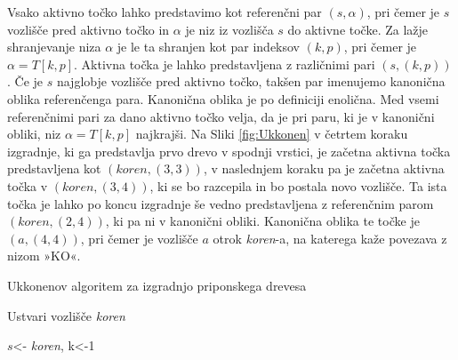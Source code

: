 Vsako aktivno točko lahko predstavimo kot referenčni par $(s,\alpha)$, pri čemer je $s$ vozlišče pred aktivno točko in $\alpha$ je niz iz vozlišča $s$ do aktivne točke. Za lažje shranjevanje niza $\alpha$ je le ta shranjen kot par indeksov $(k,p)$, pri čemer je $\alpha=T[k,p]$. Aktivna točka je lahko predstavljena z različnimi pari $(s, (k,p))$. Če je $s$  najglobje vozlišče pred aktivno točko, takšen par imenujemo kanonična oblika referenčenga para. Kanonična oblika je po definiciji enolična. Med vsemi referenčnimi pari za dano aktivno točko velja, da je pri paru, ki je v kanonični obliki, niz $\alpha=T[k,p]$ najkrajši. Na Sliki \ref{fig:Ukkonen} v četrtem koraku izgradnje, ki ga predstavlja prvo drevo v spodnji vrstici, je začetna aktivna točka predstavljena kot $(\textit{koren},(3,3))$, v naslednjem koraku pa je začetna aktivna točka v $(\textit{koren},(3,4))$, ki se bo razcepila in bo postala novo vozlišče. Ta ista točka je lahko po koncu izgradnje še vedno predstavljena z referenčnim parom $(\textit{koren},(2,4))$, ki pa ni v kanonični obliki. Kanonična oblika te točke je $(a,(4,4))$, pri čemer je vozlišče $a$ otrok \textit{koren}-a, na katerega kaže povezava z nizom »KO«.

\begin{algorithm}[htb]

    \caption{Ukkonenov algoritem za izgradnjo priponskega drevesa}\label{alg:ukkonen}
    {
        {Ustvari vozlišče \textit{koren}}
        
        {$s$<- \textit{koren}, k<-1}
        
        
    }
\end{algorithm}

